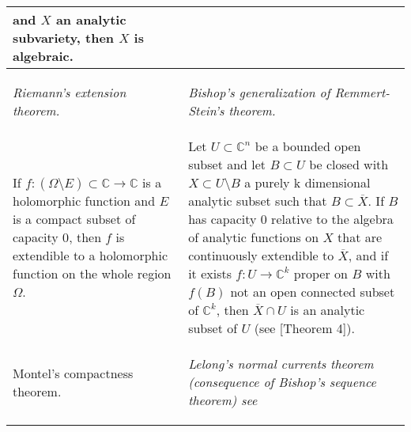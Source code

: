 \documentclass[12pt,twoside,a4paper]{report}
\newcommand{\co}{\ensuremath{\mathbb C }}
\newcommand{\con}{\ensuremath{\mathbb{C}^n}}
\newcommand{\om}{\ensuremath{\Omega}}
\begin{document}
\begin{table}[h!]
\begin{tabular}{| m{5cm} | m{5cm} |}
                                and $X$ an analytic subvariety, then $X$ is algebraic.\\
                            \midrule
                            \begin{center}
                                \textit{Riemann's extension theorem.}
                            \end{center}
                                &
                            \begin{center}
                                \textit{Bishop's generalization of Remmert-Stein's theorem.}
                            \end{center} \\
                            \midrule
                                If $f:(\om\setminus E)\subset\co\rightarrow\co$ is a holomorphic function and
                                $E$ is a compact subset of capacity $0$, then $f$ is extendible to a holomorphic
                                function on the whole region $\om$.
                                         &
                                Let $U\subset\con$ be a bounded open
                                subset and let $B\subset U$ be closed with $X\subset U\setminus B$ a purely k
                                dimensional analytic subset such that $B\subset\overline{X}$. If $B$ has
                                capacity $0$ relative to the algebra of analytic functions on $X$ that are
                                continuously extendible to $\overline{X}$, and if it exists
                                $f:U\rightarrow\co^k$ proper on $B$ with $f(B)$ not an open connected subset of
                                $\co^k$, then $\overline{X}\cap U$ is an analytic subset of $U$
                                (see \cite{Bishop}[Theorem 4]).\\
                            \midrule
                            \begin{center}
                                    Montel's compactness theorem.
                            \end{center}
                                         &
                            \begin{center}
                            \textit{Lelong's normal currents theorem (consequence of Bishop's sequence theorem) see \cite{Lelong}}

\end{center}
\end{tabular}
\end{table}
\end{document}
